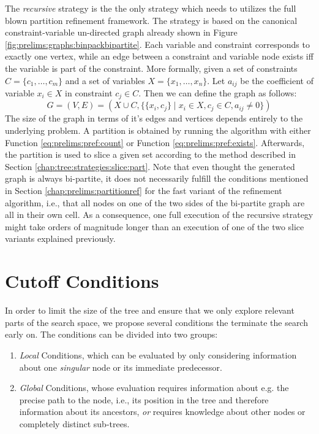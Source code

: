 			The \textit{recursive} strategy is the the only strategy which needs to utilizes the full blown partition refinement framework.
			The strategy is based on the canonical constraint-variable un-directed graph already shown in Figure \ref{fig:prelims:graphs:binpackbipartite}.
			Each variable and constraint corresponds to exactly one vertex, while an edge between a constraint and variable node exists iff the variable is part of the constraint.
			More formally, given a set of constraints $C = \{ c_1, \ldots, c_m \}$ and a set of variables $X = \{ x_1, \ldots, x_n \}$. Let $a_{ij}$ be the coefficient of variable $x_i \in X$ in constraint $c_j \in C$.
			Then we can define the graph as follows:
			\begin{equation*}
				G = (V, E) = (X \cup C, \{ \{ x_i, c_j \} \mid x_i \in X, c_j \in C, a_{ij} \neq 0 \})
			\end{equation*}
			The size of the graph in terms of it's edges and vertices depends entirely to the underlying problem. 
			A partition is obtained by running the algorithm with either Function \ref{eq:prelims:pref:count} or Function \ref{eq:prelims:pref:exists}.
			Afterwards, the partition is used to slice a given set according to the method described in Section \ref{chap:tree:strategies:slice:part}.
			Note that even thought the generated graph is always bi-partite, it does not necessarily fulfill the conditions mentioned in Section \ref{chap:prelims:partitionref} for the fast variant of the refinement algorithm, i.e., that all nodes on one of the two sides of the bi-partite graph are all in their own cell.
			As a consequence, one full execution of the recursive strategy might take orders of magnitude longer than an execution of one of the two slice variants explained previously. 
			
			\clearpage
	
	\section{Cutoff Conditions}
	\label{chap:impl:cutoff}
	
		In order to limit the size of the tree and ensure that we only explore relevant parts of the search space, we propose several conditions the terminate the search early on.
		The conditions can be divided into two groups:
		
		\begin{enumerate}
			\item \textit{Local} Conditions, which can be evaluated by only considering information about one \textit{singular} node or its immediate predecessor.
			\item \textit{Global} Conditions, whose evaluation requires information about e.g. the precise path to the node, i.e., its position in the tree and therefore information about its ancestors, \textit{or} requires knowledge about other nodes or completely distinct sub-trees.
		\end{enumerate}
		
